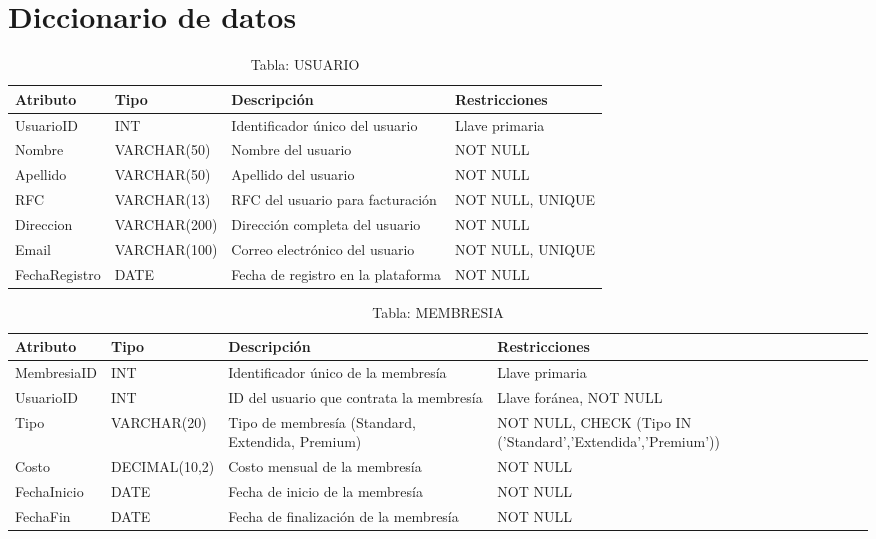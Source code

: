 \documentclass[12pt, a4paper]{article}
\begin{document}
\section{Diccionario de datos}
\begin{table}[ht]
\centering
\caption{Tabla: USUARIO}
\begin{tabular}{|l|l|p{4.5cm}|p{3.5cm}|}
\hline
\textbf{Atributo} & \textbf{Tipo} & \textbf{Descripción} &
\textbf{Restricciones} \\
\hline
UsuarioID & INT & Identificador único del usuario & Llave primaria \\
\hline
Nombre & VARCHAR(50) & Nombre del usuario & NOT NULL \\
\hline
Apellido & VARCHAR(50) & Apellido del usuario & NOT NULL \\
\hline
RFC & VARCHAR(13) & RFC del usuario para facturación & NOT NULL, UNIQUE \\
\hline
Direccion & VARCHAR(200) & Dirección completa del usuario & NOT NULL \\
\hline
Email & VARCHAR(100) & Correo electrónico del usuario & NOT NULL, UNIQUE \\
\hline
FechaRegistro & DATE & Fecha de registro en la plataforma & NOT NULL \\
\hline
\end{tabular}
\end{table}
\newpage

\begin{table}[ht]
\centering
\caption{Tabla: MEMBRESIA}
\begin{tabular}{|l|l|p{4.5cm}|p{3.5cm}|}
\hline
\textbf{Atributo} & \textbf{Tipo} & \textbf{Descripción} &
\textbf{Restricciones} \\
\hline
MembresiaID & INT & Identificador único de la membresía & Llave primaria \\
\hline
UsuarioID & INT & ID del usuario que contrata la membresía & Llave foránea, NOT
NULL \\
\hline
Tipo & VARCHAR(20) & Tipo de membresía (Standard, Extendida, Premium) & NOT
NULL, CHECK (Tipo IN ('Standard','Extendida','Premium')) \\
\hline
Costo & DECIMAL(10,2) & Costo mensual de la membresía & NOT NULL \\
\hline
FechaInicio & DATE & Fecha de inicio de la membresía & NOT NULL \\
\hline
FechaFin & DATE & Fecha de finalización de la membresía & NOT NULL \\
\hline
\end{tabular}
\end{table}
\newpage
\end{document}
